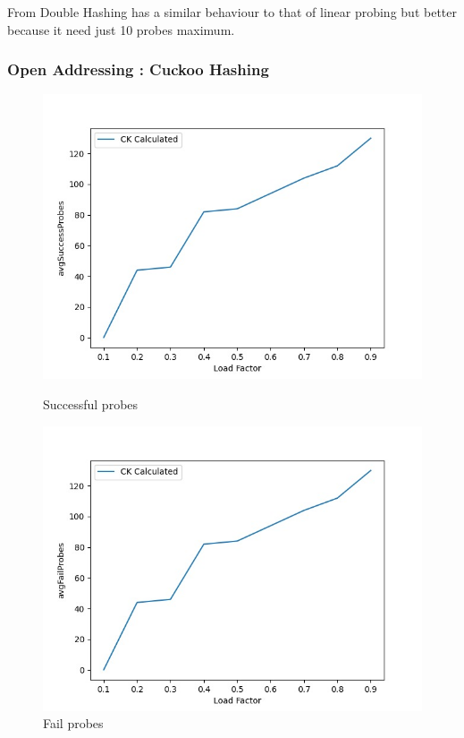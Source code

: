 \documentclass{article}
\begin{document}
    From Double Hashing has a similar behaviour to that of linear probing but better because it need just 10 probes maximum. 
    
    \subsubsection*{Open Addressing : Cuckoo Hashing}

        \begin{figure}[!h]
          \includegraphics[width=\linewidth]{images/loadFactor_vs_avgSuccessProbes_CK.jpeg}
          \caption{Successful probes}\label{fig:plot10}
        \endminipage\hfill
          \includegraphics[width=\linewidth]{images/loadFactor_vs_avgFailProbes_CK.jpeg}
          \caption{Fail probes}\label{fig:plot11}
        \endminipage
    \end{figure}
    
\end{document}
